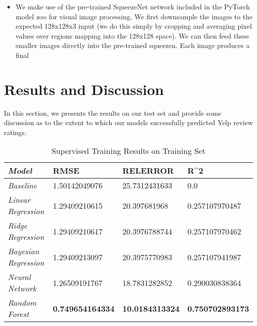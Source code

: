 \documentclass[letterpaper, 10 pt, conference]{ieeeconf}  %
\begin{document}
\begin{itemize}
\item We make use of the pre-trained SqueezeNet network included in the PyTorch model zoo for visual image processing. We first downsample the images to the expected 128x128x3 input (we do this simply by cropping and averaging pixel values over regions mapping into the 128x128 space). We can then feed these smaller images directly into the pre-trained squeezen. Each image produces a final 
\end{itemize}


\section{Results and Discussion}
In this section, we presents the results on our test set and provide some discussion as to the extent to which our models successfully predicted Yelp review ratings.

{\renewcommand{\arraystretch}{2}%
\begin{table*}[]
\centering
\caption{Supervised Training Results on Training Set}
\label{table:trainint_set_results}
\begin{tabular}{|l|lll}
\hline
\textit{\textbf{Model}}      & \multicolumn{1}{l|}{\textbf{RMSE}} & \multicolumn{1}{l|}{\textbf{RELERROR}} & \multicolumn{1}{l|}{\textbf{R\textasciicircum 2}} \\ \hline
\textit{Baseline}            & 1.50142049076                      & 25.7312431633                          & 0.0                                               \\ \cline{1-1}
\textit{Linear Regression}   & 1.29409210615                      & 20.397681968                           & 0.257107970487                                    \\ \cline{1-1}
\textit{Ridge Regression}    & 1.29409210617                      & 20.3976788744                          & 0.257107970462                                    \\ \cline{1-1}
\textit{Bayesian Regression} & 1.29409213097                      & 20.3975770983                          & 0.257107941987                                    \\ \cline{1-1}
\textit{Neural Network}      & 1.26509191767                      & 18.7831282852                          & 0.290030838364                                    \\ \cline{1-1}
\textit{Random Forest}       & \textbf{0.749654164334}            & \textbf{10.0184313324}                 & \textbf{0.750702893173}                           \\ \cline{1-1}
\end{tabular}
\end{table*}
}
\end{document}
